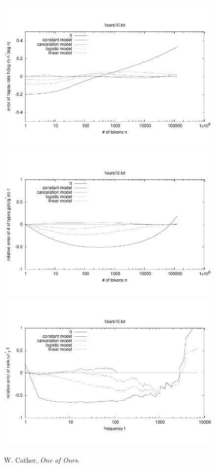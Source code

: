 \documentclass[a4paper,12pt]{article}
\begin{document}
\begin{figure}[p]
  \centering
  \vspace{-2em}
  \includegraphics[width=0.8\columnwidth]{output/herdan/1ours10_27/token_ratio_residual.pdf}
  \\[-3em]
  \includegraphics[width=0.8\columnwidth]{output/herdan/1ours10_27/token_residual.pdf}
  \\[-3em]
  \includegraphics[width=0.8\columnwidth]{output/herdan/1ours10_27/frequency_residual.pdf}
  \vspace{-2em}
  \caption{W. Cather, \emph{One of Ours}.\label{fig1ours10R}}
\end{figure}
\end{document}
